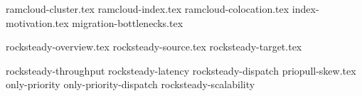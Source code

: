  {ramcloud-cluster.tex}
 {ramcloud-index.tex}
 {ramcloud-colocation.tex}
 {index-motivation.tex}
 {migration-bottlenecks.tex}

\clearpage

 {rocksteady-overview.tex}
 {rocksteady-source.tex}
 {rocksteady-target.tex}

\clearpage

 {rocksteady-throughput}
 {rocksteady-latency}
 {rocksteady-dispatch}
 {priopull-skew.tex}
 {only-priority}
 {only-priority-dispatch}
 {rocksteady-scalability}
